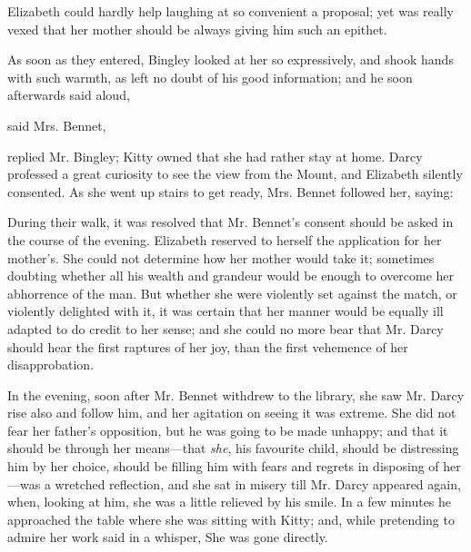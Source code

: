 Elizabeth could hardly help laughing at so convenient a proposal; yet was really vexed that her mother should be always giving him such an epithet.

As soon as they entered, Bingley looked at her so expressively, and shook hands with such warmth, as left no doubt of his good information; and he soon afterwards said aloud, 

 said Mrs. Bennet, 

 replied Mr. Bingley;  Kitty owned that she had rather stay at home. Darcy professed a great curiosity to see the view from the Mount, and Elizabeth silently consented. As she went up stairs to get ready, Mrs. Bennet followed her, saying:


During their walk, it was resolved that Mr. Bennet's consent should be asked in the course of the evening. Elizabeth reserved to herself the application for her mother's. She could not determine how her mother would take it; sometimes doubting whether all his wealth and grandeur would be enough to overcome her abhorrence of the man. But whether she were violently set against the match, or violently delighted with it, it was certain that her manner would be equally ill adapted to do credit to her sense; and she could no more bear that Mr. Darcy should hear the first raptures of her joy, than the first vehemence of her disapprobation.

In the evening, soon after Mr. Bennet withdrew to the library, she saw Mr. Darcy rise also and follow him, and her agitation on seeing it was extreme. She did not fear her father's opposition, but he was going to be made unhappy; and that it should be through her means---that {\em she}, his favourite child, should be distressing him by her choice, should be filling him with fears and regrets in disposing of her---was a wretched reflection, and she sat in misery till Mr. Darcy appeared again, when, looking at him, she was a little relieved by his smile. In a few minutes he approached the table where she was sitting with Kitty; and, while pretending to admire her work said in a whisper,  She was gone directly.

